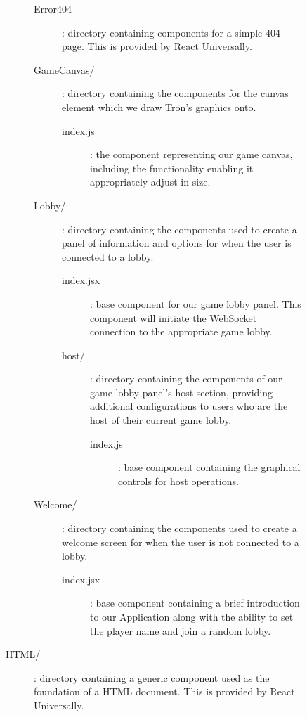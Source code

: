 \documentclass{standalone}
\begin{document}
\begin{formal}
\begin{description}
\begin{description}
\begin{description}
\begin{description}
		        			\item[Error404]: directory containing components for a simple 404 page. This is provided by React Universally.

		        			\item[GameCanvas/]: directory containing the components for the canvas element which we draw Tron's graphics onto.
					      	\begin{description}
		        				\item[index.js]: the component representing our game canvas, including the functionality enabling it appropriately adjust in size.
							    \end{description}

		        			\item[Lobby/]: directory containing the components used to create a panel of information and options for when the user is connected to a lobby.
					      	\begin{description}
		        				\item[index.jsx]: base component for our game lobby panel. This component will initiate the WebSocket connection to the appropriate game lobby.

		        				\item[host/]: directory containing the components of our game lobby panel's host section, providing additional configurations to users who are the host of their current game lobby.
				      			\begin{description}
		        					\item[index.js]: base component containing the graphical controls for host operations.
						    		\end{description}
							    \end{description}

		        			\item[Welcome/]: directory containing the components used to create a welcome screen for when the user is not connected to a lobby.
					      	\begin{description}
		        				\item[index.jsx]: base component containing a brief introduction to our Application along with the ability to set the player name and join a random lobby.
						    \end{description}


					    \end{description}

					    \item[HTML/]: directory containing a generic component used as the foundation of a HTML document. This is provided by React Universally.
			    	\end{description}


\end{description}
\end{description}
\end{formal}
\end{document}
